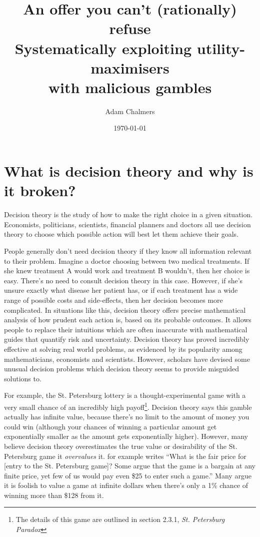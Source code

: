 \documentclass{article}
\title{%
  An offer you can't (rationally) refuse \\
  \large Systematically exploiting utility-maximisers \\
    with malicious gambles}
\author{Adam Chalmers}
\date{\today}
\begin{document}
\frenchspacing
\onehalfspacing
\maketitle

\section{What is decision theory and why is it broken?}

Decision theory is the study of how to make the right choice in a given situation. Economists, politicians, scientists, financial planners and doctors all use decision theory to choose which possible action will best let them achieve their goals.

People generally don't need decision theory if they know all information relevant to their problem. Imagine a doctor choosing between two medical treatments. If she knew treatment A would work and treatment B wouldn't, then her choice is easy. There's no need to consult decision theory in this case. However, if she's unsure exactly what disease her patient has, or if each treatment has a wide range of possible costs and side-effects, then her decision becomes more complicated. In situations like this, decision theory offers precise mathematical analysis of how prudent each action is, based on its probable outcomes. It allows people to replace their intuitions \textemdash{} which are often inaccurate \textemdash{} with mathematical guides that quantify risk and uncertainty. Decision theory has proved incredibly effective at solving real world problems, as evidenced by its popularity among mathematicians, economists and scientists. However, scholars have devised some unusual decision problems which decision theory seems to provide misguided solutions to. 

For example, the St. Petersburg lottery is a thought-experimental game with a very small chance of an incredibly high payoff\footnote{The details of this game are outlined in section 2.3.1, \textit{St. Petersburg Paradox}}. Decision theory says this gamble actually has infinite value, because there's no limit to the amount of money you could win (although your chances of winning a particular amount get exponentially smaller as the amount gets exponentially higher). However, many believe decision theory overestimates the true value or desirability of the St. Petersburg game \textemdash{} it \textit{overvalues} it. \citep{hacking1980strange} for example writes ``What is the fair price for [entry to the St. Petersburg game]? Some argue that the game is a bargain at any finite price, yet few of us would pay even \$25 to enter such a game.'' Many argue it is foolish to value a game at infinite dollars when there's only a 1\% chance of winning more than \$128 from it.
\end{document}
